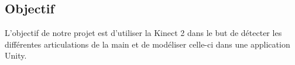 \subsection{Objectif}
L'objectif de notre projet est d'utiliser la Kinect 2 dans le but de détecter les différentes articulations
de la main et de modéliser celle-ci dans une application Unity.
